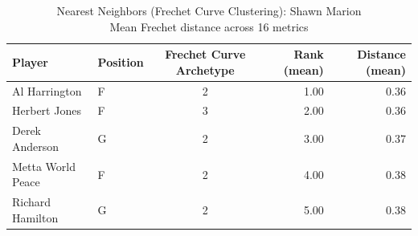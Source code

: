 \begin{table}[t]
\caption*{
{\fontsize{20}{25} Nearest Neighbors (Frechet Curve Clustering): Shawn Marion\fontsize{12}{15}\selectfont } \\ 
{\fontsize{14}{17}\selectfont  Mean Frechet distance across 16 metrics\fontsize{12}{15}\selectfont }
} 
\fontsize{12.0pt}{14.0pt}\selectfont
\begin{tabular*}{\linewidth}{@{\extracolsep{\fill}}llcrr}
\toprule
Player & Position & Frechet Curve Archetype & Rank (mean) & Distance (mean) \\ 
\midrule\addlinespace[2.5pt]
Al Harrington & F & 2 & 1.00 & 0.36 \\ 
Herbert Jones & F & 3 & 2.00 & 0.36 \\ 
Derek Anderson & G & 2 & 3.00 & 0.37 \\ 
Metta World Peace & F & 2 & 4.00 & 0.38 \\ 
Richard Hamilton & G & 2 & 5.00 & 0.38 \\ 
\bottomrule
\end{tabular*}
\end{table}

